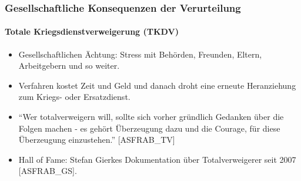 \documentclass{beamer}
\begin{document}
	\begin{frame}
		  	\frametitle{Gesellschaftliche Konsequenzen der Verurteilung}
		  	\framesubtitle{Totale Kriegsdienstverweigerung (TKDV)}
		  	\begin{itemize}
		  		\item Gesellschaftlichen Ächtung: Stress mit Behörden, Freunden, Eltern, Arbeitgebern und so weiter.
		  		\item Verfahren kostet Zeit und Geld und danach droht eine erneute Heranziehung zum Kriegs- oder Ersatzdienst.
		  		\item \enquote{Wer totalverweigern will, sollte sich vorher gründlich Gedanken über die Folgen machen - es gehört Überzeugung dazu und die Courage, für diese Überzeugung einzustehen.} [ASFRAB\_TV]
		  		\item Hall of Fame: Stefan Gierkes Dokumentation über Totalverweigerer seit 2007 [ASFRAB\_GS]. 
		  	\end{itemize}
	\end{frame}
	
\end{document}
